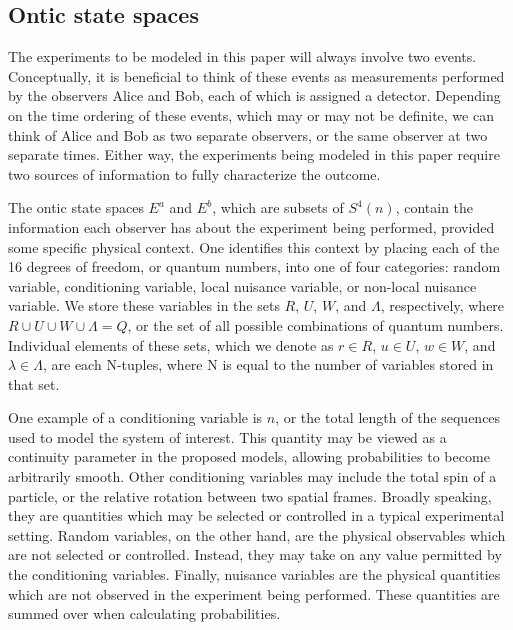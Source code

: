 \documentclass{article}
\begin{document}
\subsection{Ontic state spaces \label{sec: Ontic state spaces}}

The experiments to be modeled in this paper will always involve two events. Conceptually, it is beneficial to think of these events as measurements performed by the observers Alice and Bob, each of which is assigned a detector. Depending on the time ordering of these events, which may or may not be definite, we can think of Alice and Bob as two separate observers, or the same observer at two separate times. Either way, the experiments being modeled in this paper require two sources of information to fully characterize the outcome.

The ontic state spaces $E^a$ and $E^b$, which are subsets of $S^4(n)$, contain the information each observer has about the experiment being performed, provided some specific physical context. One identifies this context by placing each of the 16 degrees of freedom, or quantum numbers, into one of four categories: random variable, conditioning variable, local nuisance variable, or non-local nuisance variable. We store these variables in the sets $R$, $U$, $W$, and $\Lambda$, respectively, where $R\cup U \cup W \cup \Lambda = Q$, or the set of all possible combinations of quantum numbers. Individual elements of these sets, which we denote as $r\in R$, $u \in U$, $w \in W$, and $\lambda \in \Lambda$, are each N-tuples, where N is equal to the number of variables stored in that set.

One example of a conditioning variable is $n$, or the total length of the sequences used to model the system of interest. This quantity may be viewed as a continuity parameter in the proposed models, allowing probabilities to become arbitrarily smooth. Other conditioning variables may include the total spin of a particle, or the relative rotation between two spatial frames. Broadly speaking, they are quantities which may be selected or controlled in a typical experimental setting. Random variables, on the other hand, are the physical observables which are not selected or controlled. Instead, they may take on any value permitted by the conditioning variables. Finally, nuisance variables are the physical quantities which are not observed in the experiment being performed. These quantities are summed over when calculating probabilities.
\end{document}
